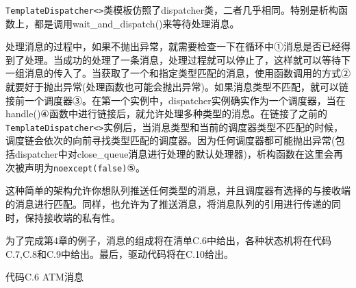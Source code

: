 \texttt{TemplateDispatcher<>}类模板仿照了dispatcher类，二者几乎相同。特别是析构函数上，都是调用wait\_and\_dispatch()来等待处理消息。

处理消息的过程中，如果不抛出异常，就需要检查一下在循环中①消息是否已经得到了处理。当成功的处理了一条消息，处理过程就可以停止了，这样就可以等待下一组消息的传入了。当获取了一个和指定类型匹配的消息，使用函数调用的方式②就要好于抛出异常(处理函数也可能会抛出异常)。如果消息类型不匹配，就可以链接前一个调度器③。在第一个实例中，dispatcher实例确实作为一个调度器，当在handle()④函数中进行链接后，就允许处理多种类型的消息。在链接了之前的\texttt{TemplateDispatcher<>}实例后，当消息类型和当前的调度器类型不匹配的时候，调度链会依次的向前寻找类型匹配的调度器。因为任何调度器都可能抛出异常(包括dispatcher中对close\_queue消息进行处理的默认处理器)，析构函数在这里会再次被声明为\texttt{noexcept(false)}⑤。

这种简单的架构允许你想队列推送任何类型的消息，并且调度器有选择的与接收端的消息进行匹配。同样，也允许为了推送消息，将消息队列的引用进行传递的同时，保持接收端的私有性。

为了完成第4章的例子，消息的组成将在清单C.6中给出，各种状态机将在代码C.7,C.8和C.9中给出。最后，驱动代码将在C.10给出。

代码C.6 ATM消息

